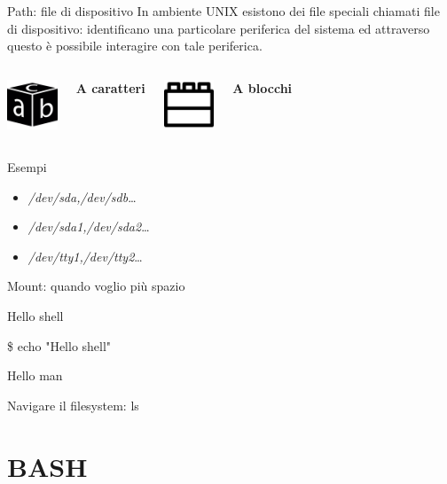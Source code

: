 \documentclass{beamer}
\begin{document}
    \begin{frame}{Path: file di dispositivo}
        In ambiente UNIX esistono dei file speciali chiamati file di dispositivo:
        identificano una particolare periferica del sistema ed attraverso questo è possibile interagire con tale periferica. \\
        \vspace{0.25cm}
        \begin{columns}[t, onlytextwidth]
                \centering
                \includegraphics[height=1.5cm, keepaspectratio]{images/char.pdf}
                
                \textbf{A caratteri}

                \centering
                \includegraphics[height=1.5cm, keepaspectratio]{images/block.pdf}
                
                \textbf{A blocchi}
        \end{columns}

        \vspace{0.25cm}

        \begin{exampleblock}{Esempi}
            \begin{itemize}
                \item \textit{/dev/sda,/dev/sdb}\dots
                \item \textit{/dev/sda1,/dev/sda2}\dots
                \item \textit{/dev/tty1,/dev/tty2}\dots
            \end{itemize}
        \end{exampleblock}
    \end{frame}

    \begin{frame}{Mount: quando voglio più spazio}
    \end{frame}

    \begin{frame}{Hello shell}
        \begin{block}{}
            \$ echo "Hello shell" 
        \end{block}
    \end{frame}

    \begin{frame}{Hello man}
    \end{frame}

    \begin{frame}{Navigare il filesystem: ls}
    \end{frame}

    \section{BASH}
    
\end{document}
